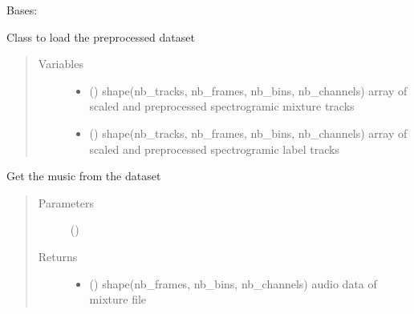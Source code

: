 \documentclass[letterpaper,10pt,english]{sphinxmanual}
\begin{document}
\begin{fulllineitems}
\label{\detokenize{docs/source/dataset:dataset.Dataset}}
Bases: 

Class to load the preprocessed dataset
\begin{quote}\begin{description}
\item[{Variables}] \leavevmode\begin{itemize}
\item {} 
 () \textendash{} shape(nb\_tracks, nb\_frames, nb\_bins, nb\_channels)
array of scaled and preprocessed spectrogramic mixture tracks

\item {} 
 () \textendash{} shape(nb\_tracks, nb\_frames, nb\_bins, nb\_channels)
array of scaled and preprocessed spectrogramic label tracks

\end{itemize}

\end{description}\end{quote}

\begin{fulllineitems}
\label{\detokenize{docs/source/dataset:dataset.Dataset.__getitem__}}
Get the music from the dataset
\begin{quote}\begin{description}
\item[{Parameters}] \leavevmode
{} () \textendash{} 

\item[{Returns}] \leavevmode
\begin{itemize}
\item {} 
 () \textendash{} shape(nb\_frames, nb\_bins, nb\_channels)
audio data of mixture file


\end{itemize}
\end{description}
\end{quote}
\end{fulllineitems}
\end{fulllineitems}
\end{document}
